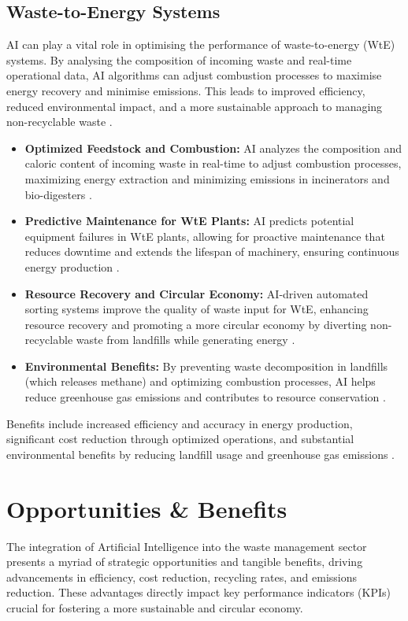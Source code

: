 \subsection{Waste-to-Energy Systems}
AI can play a vital role in optimising the performance of waste-to-energy (WtE) systems. By analysing the composition of incoming waste and real-time operational data, AI algorithms can adjust combustion processes to maximise energy recovery and minimise emissions. This leads to improved efficiency, reduced environmental impact, and a more sustainable approach to managing non-recyclable waste \cite{fang2023artificial}.
\begin{itemize}
    \item \textbf{Optimized Feedstock and Combustion:} AI analyzes the composition and caloric content of incoming waste in real-time to adjust combustion processes, maximizing energy extraction and minimizing emissions in incinerators and bio-digesters \cite{AlamAvani_WtE, Jetir_WtE}.
    \item \textbf{Predictive Maintenance for WtE Plants:} AI predicts potential equipment failures in WtE plants, allowing for proactive maintenance that reduces downtime and extends the lifespan of machinery, ensuring continuous energy production \cite{PandawanID_WtE, ETEG_WtE}.
    \item \textbf{Resource Recovery and Circular Economy:} AI-driven automated sorting systems improve the quality of waste input for WtE, enhancing resource recovery and promoting a more circular economy by diverting non-recyclable waste from landfills while generating energy \cite{SWANA_WtE, ITU_WtE}.
\item \textbf{Environmental Benefits:} By preventing waste decomposition in landfills (which releases methane) and optimizing combustion processes, AI helps reduce greenhouse gas emissions and contributes to resource conservation \cite{IJSAT_WtE}.
\end{itemize}
Benefits include increased efficiency and accuracy in energy production, significant cost reduction through optimized operations, and substantial environmental benefits by reducing landfill usage and greenhouse gas emissions \cite{Jetir_WtE, Jetir_WtE}.

\section{Opportunities \& Benefits}

The integration of Artificial Intelligence into the waste management sector presents a myriad of strategic opportunities and tangible benefits, driving advancements in efficiency, cost reduction, recycling rates, and emissions reduction. These advantages directly impact key performance indicators (KPIs) crucial for fostering a more sustainable and circular economy.

